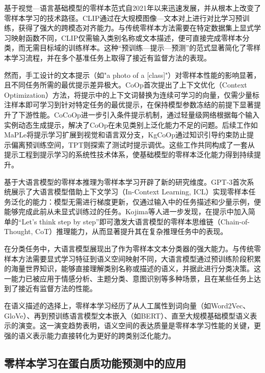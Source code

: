 基于视觉—语言基础模型的零样本范式自2021年以来迅速发展，并从根本上改变了零样本学习的技术路径。CLIP\cite{radford2021learning}通过在大规模图像—文本对上进行对比学习预训练，获得了强大的跨模态对齐能力。与传统零样本方法需要在特定数据集上显式学习映射函数不同，CLIP仅需输入类别名称或文本描述，便可直接完成零样本分类，而无需目标域的训练样本。这种“预训练—提示—预测”的范式显著简化了零样本学习流程，并在多个基准任务上取得了接近有监督方法的表现。

然而，手工设计的文本提示（如"a photo of a [class]"）对零样本性能的影响显著，且不同任务所需的最优提示差异极大。CoOp\cite{zhou2022learning}首次提出了上下文优化（Context Optimization）方法，将提示中的上下文词替换为连续可学习的向量，仅需少量标注样本即可学习到针对特定任务的最优提示，在保持模型参数冻结的前提下显著提升了下游性能。CoCoOp\cite{zhou2022conditional}进一步引入条件提示机制，通过轻量级网络根据每个输入实例动态生成提示，解决了CoOp在未见类别上泛化能力不足的问题。后续工作如MaPLe\cite{khattak2023maple}将提示学习扩展到视觉和语言双分支，KgCoOp\cite{yao2023kgcoop}通过知识引导约束防止提示偏离预训练空间，TPT\cite{shu2022test}则探索了测试时提示调优。这些工作共同构成了一套从提示工程到提示学习的系统性技术体系，使基础模型的零样本泛化能力得到持续提升。

基于大语言模型的零样本推理为零样本学习开辟了新的研究维度。GPT-3\cite{brown2020language}首次系统展示了大语言模型借助上下文学习（In-Context Learning, ICL）实现零样本任务泛化的能力：模型无需进行梯度更新，仅通过输入中的任务描述和少量示例，便能够完成此前从未显式训练过的任务。Kojima等人\cite{kojima2022large}进一步发现，在提示中加入简单的“Let's think step by step”即可激发大语言模型的零样本思维链（Chain-of-Thought, CoT）推理能力，从而显著提升其在复杂推理任务中的表现。

在分类任务中，大语言模型展现出了作为零样本文本分类器的强大能力\cite{sun2023text}。与传统零样本方法需要显式学习特征到语义空间映射不同，大语言模型通过预训练阶段积累的海量世界知识，能够直接理解类别名称或描述的语义，并据此进行分类决策。这一能力已被应用于情感分析、主题分类、意图识别等多种场景，且在某些任务上达到了接近有监督方法的性能。

在语义描述的选择上，零样本学习经历了从人工属性到词向量（如Word2Vec\cite{mikolov2013efficient}、GloVe\cite{pennington2014glove}）、再到预训练语言模型文本嵌入（如BERT\cite{devlin2019bert}）、直至大规模基础模型语义表示的演变。这一演变趋势表明，语义空间的表达质量是零样本学习性能的关键，更强的语义表示能力直接转化为更好的跨类别泛化能力。

\subsection{零样本学习在蛋白质功能预测中的应用}

